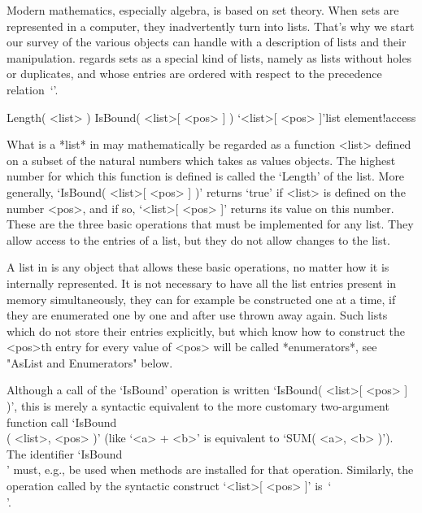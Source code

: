 
Modern mathematics, especially algebra, is based on set theory. When sets
are represented in a computer, they inadvertently turn into lists. That's
why we start our  survey of the various  objects {\GAP} can handle with a
description of  lists  and their  manipulation. {\GAP}  regards sets as a
special kind of lists, namely  as lists without  holes or duplicates, and
whose entries are ordered with respect to the precedence relation~`\<'.


\>Length( <list> )
\>IsBound( <list>[ <pos> ] )
\>`<list>[ <pos> ]'{list element!access}

What is a *list* in  {\GAP} may mathematically be  regarded as a function
<list> defined on  a subset of the  natural numbers which takes as values
{\GAP} objects. The highest number for which this  function is defined is
called the `Length' of the list. More  generally, `IsBound( <list>[ <pos>
] )' returns `true' if <list> is defined on the number  <pos>, and if so,
`<list>[ <pos> ]'  returns its value on this  number. These are the three
basic operations that must be implemented for any list. They allow access
to the entries of a list, but they do not allow changes to the list.

A list  in {\GAP} is  any object that allows   these basic operations, no
matter how it is internally represented. It is  not necessary to have all
the  list entries present in  memory simultaneously, they can for example
be constructed one at a time, if they are enumerated one by one and after
use  thrown away  again. Such  lists  which  do not  store their  entries
explicitly, but which know  how to construct  the <pos>th entry for every
value of <pos> will be called *enumerators*, see "AsList and Enumerators"
below.

Although a  call of the `IsBound'  operation is written `IsBound( <list>[
<pos> ]  )', this is merely a  syntactic equivalent to the more customary
two-argument function call `IsBound\\[\\](  <list>, <pos> )' (like `<a> +
<b>' is equivalent to `SUM( <a>,  <b> )'). The identifier `IsBound\\[\\]'
must,  e.g.,   be used  when methods  are  installed for  that operation.
Similarly, the operation called by the syntactic construct `<list>[ <pos>
]' is~`\\[\\]'.

